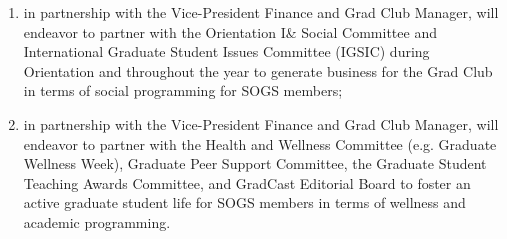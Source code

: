 \begin{enumerate}[label*=\arabic*., align=left]
\begin{enumerate}[label*=\arabic*., align=left]
\begin{enumerate}[label*=\arabic*., align=left]
\end{enumerate}
\item in partnership with the Vice-President Finance and Grad Club Manager, will endeavor to partner with the Orientation I\& Social Committee and International Graduate Student Issues Committee (IGSIC) during Orientation and throughout the year to generate business for the Grad Club in terms of social programming for SOGS members;
\item in partnership with the Vice-President Finance and Grad Club Manager, will endeavor to partner with the Health and Wellness Committee (e.g. Graduate Wellness Week), Graduate Peer Support Committee, the Graduate Student Teaching Awards Committee, and GradCast Editorial Board to foster an active graduate student life for SOGS members in terms of wellness and academic programming.
\end{enumerate}
\end{enumerate}